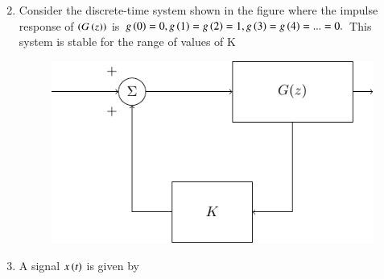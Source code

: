 \documentclass[journal]{IEEEtran}
\begin{document}
\begin{enumerate}
\begin{enumerate}
\begin{multicols}{2}
				\end{multicols}
		\end{enumerate}
	\item Consider the discrete-time system shown in the figure where the impulse response of $\left(G\left(z\right)\right)$ is $g\left(0\right)=0, g\left(1\right)=g\left(2\right)=1, g\left(3\right)=g\left(4\right)=...=0.$ This system is stable for the range of values of K
\begin{figure}[H]
			\centering
			\includegraphics[scale=0.75]{figs/fig36.png}
			\label{stemplot}
		\end{figure}
		\begin{enumerate}
		\end{enumerate}
	\item A signal $x\left(t\right)$ is given by


\end{enumerate}
\end{document}
